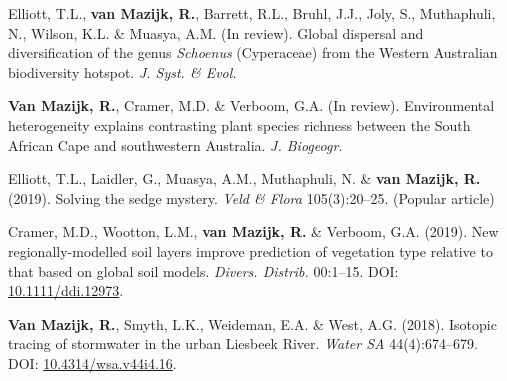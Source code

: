 \begin{hangparas}{2em}{1}

Elliott, T.L., \textbf{van Mazijk, R.}, Barrett, R.L., Bruhl, J.J., Joly, S.,
Muthaphuli, N., Wilson, K.L. \& Muasya, A.M. (In review). Global dispersal and
diversification of the genus \textit{Schoenus} (Cyperaceae) from the Western
Australian biodiversity hotspot. \textit{J. Syst. \& Evol.}

\textbf{Van Mazijk, R.}, Cramer, M.D. \& Verboom, G.A. (In review).
Environmental heterogeneity explains contrasting plant species richness between
the South African Cape and southwestern Australia. \textit{J. Biogeogr.}

Elliott, T.L., Laidler, G., Muasya, A.M., Muthaphuli, N. \& \textbf{van Mazijk,
R.} (2019). Solving the sedge mystery. \textit{Veld \& Flora} 105(3):20--25.
(Popular article)

Cramer, M.D., Wootton, L.M., \textbf{van Mazijk, R.} \& Verboom, G.A. (2019).
New regionally-modelled soil layers improve prediction of vegetation type
relative to that based on global soil models. \textit{Divers. Distrib.}
00:1--15. DOI: \href{https://doi.org/10.1111/ddi.12973}{10.1111/ddi.12973}.

\textbf{Van Mazijk, R.}, Smyth, L.K., Weideman, E.A. \& West, A.G. (2018).
Isotopic tracing of stormwater in the urban Liesbeek River. \textit{Water SA}
44(4):674--679. DOI:
\href{https://doi.org/10.4314/wsa.v44i4.16}{10.4314/wsa.v44i4.16}.

\end{hangparas}

